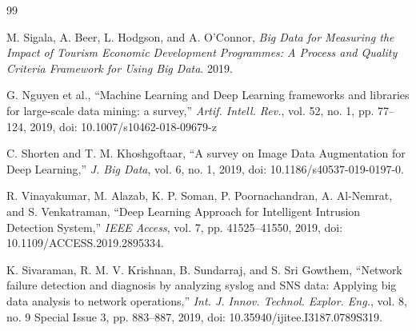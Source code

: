 \documentclass{iaesarticle}
\begin{document}



%


\begin{thebibliography} {99} 
\footnotesize
\itemsep 0pt 




 M. Sigala, A. Beer, L. Hodgson, and A. O’Connor, \emph{Big Data for Measuring the Impact of Tourism Economic Development Programmes: A Process and Quality Criteria Framework for Using Big Data}. 2019.

 G. Nguyen et al., “Machine Learning and Deep Learning frameworks and libraries for large-scale data mining: a survey,” \textsl{Artif. Intell. Rev.}, vol. 52, no. 1, pp. 77–124, 2019, doi: 10.1007/s10462-018-09679-z

 C. Shorten and T. M. Khoshgoftaar, “A survey on Image Data Augmentation for Deep Learning,” \textsl{J. Big Data}, vol. 6, no. 1, 2019, doi: 10.1186/s40537-019-0197-0.

 R. Vinayakumar, M. Alazab, K. P. Soman, P. Poornachandran, A. Al-Nemrat, and S. Venkatraman, “Deep Learning Approach for Intelligent Intrusion Detection System,” \textsl{IEEE Access}, vol. 7, pp. 41525–41550, 2019, doi: 10.1109/ACCESS.2019.2895334.

 K. Sivaraman, R. M. V. Krishnan, B. Sundarraj, and S. Sri Gowthem, “Network failure detection and diagnosis by analyzing syslog and SNS data: Applying big data analysis to network operations,” \textsl{Int. J. Innov. Technol. Explor. Eng.}, vol. 8, no. 9 Special Issue 3, pp. 883–887, 2019, doi: 10.35940/ijitee.I3187.0789S319.


\end{thebibliography}
\end{document}
